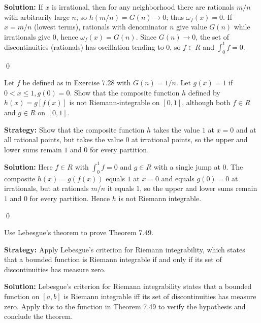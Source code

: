 \bigskip\noindent\textbf{Solution:}
If $x$ is irrational, then for any neighborhood there are rationals $m/n$ with arbitrarily large $n$, so $h(m/n)=G(n)\to 0$; thus $\omega_f(x)=0$. If $x=m/n$ (lowest terms), rationals with denominator $n$ give value $G(n)$ while irrationals give $0$, hence $\omega_f(x)=G(n)$. Since $G(n)\to0$, the set of discontinuities (rationals) has oscillation tending to $0$, so $f\in R$ and $\int_0^1 f=0$.




\qed
\begin{problembox}
\begin{problemstatement}
Let $f$ be defined as in Exercise 7.28 with $G(n) = 1/n$. Let $g(x) = 1$ if $0 < x \leq 1, g(0) = 0$. Show that the composite function $h$ defined by $h(x) = g[f(x)]$ is not Riemann-integrable on $[0, 1]$, although both $f \in R$ and $g \in R$ on $[0, 1]$.
\end{problemstatement}
\end{problembox}

\noindent\textbf{Strategy:} Show that the composite function $h$ takes the value $1$ at $x = 0$ and at all rational points, but takes the value $0$ at irrational points, so the upper and lower sums remain $1$ and $0$ for every partition.

\bigskip\noindent\textbf{Solution:}
Here $f\in R$ with $\int_0^1 f=0$ and $g\in R$ with a single jump at $0$. The composite $h(x)=g(f(x))$ equals $1$ at $x=0$ and equals $g(0)=0$ at irrationals, but at rationals $m/n$ it equals $1$, so the upper and lower sums remain $1$ and $0$ for every partition. Hence $h$ is not Riemann integrable.




\qed
\begin{problembox}
\begin{problemstatement}
Use Lebesgue's theorem to prove Theorem 7.49.
\end{problemstatement}
\end{problembox}

\noindent\textbf{Strategy:} Apply Lebesgue's criterion for Riemann integrability, which states that a bounded function is Riemann integrable if and only if its set of discontinuities has measure zero.

\bigskip\noindent\textbf{Solution:}
Lebesgue's criterion for Riemann integrability states that a bounded function on $[a,b]$ is Riemann integrable iff its set of discontinuities has measure zero. Apply this to the function in Theorem 7.49 to verify the hypothesis and conclude the theorem.




